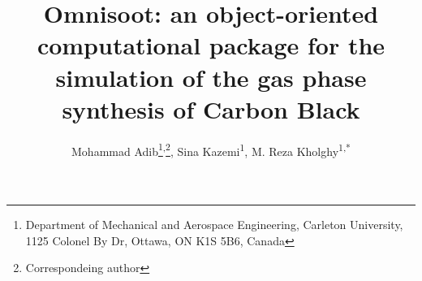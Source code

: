 	\title{\renewcommand\baselinestretch{1}\bf
		Omnisoot: an object-oriented computational package for the simulation of the gas phase synthesis of Carbon Black
		}
	\renewcommand\baselinestretch{0.8}
	\author{
	Mohammad Adib{\vspace{0.4em}}\footnote{\scriptsize{Department of Mechanical and Aerospace Engineering, Carleton University, 1125 Colonel By Dr, Ottawa, ON K1S 5B6, Canada}}{\hspace{0.3em}}\textsuperscript{,}{\hspace{0.01em}}\footnote{\scriptsize{Correspondeing author}},
	Sina Kazemi\textsuperscript{1}{\vspace{0.4em}},  
	M. Reza Kholghy\textsuperscript{1,*} 
}
	\date{}
	\maketitle
	\renewcommand\baselinestretch{1.3}
	
